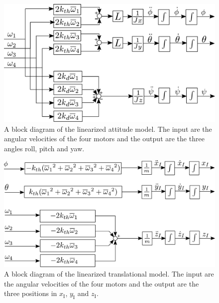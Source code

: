 \begin{figure}[H]
	\centering
	\includegraphics[scale=0.35]{figures/LinearModelBlockDiag.pdf}
	\caption{A block diagram of the linearized attitude model. The input are the angular velocities of the four motors and the output are the three angles roll, pitch and yaw.}
	\label{fig:LinearModelBlockDiagram}
\end{figure}

\begin{figure}[H]
	\centering
	\includegraphics[scale=0.35]{figures/TranslationalLinearModelBlockDiagram.pdf}
	\caption{A block diagram of the linearized translational model. The input are the angular velocities of the four motors and the output are the three positions in $x_{\mathrm{I}}$, $y_{\mathrm{I}}$ and $z_{\mathrm{I}}$.}	\label{fig:TranslationalLinearModelBlockDiagram}
\end{figure}

